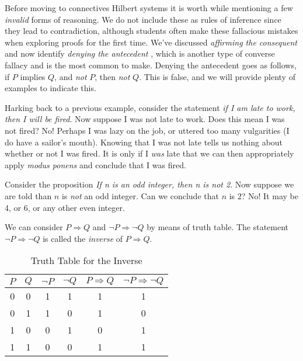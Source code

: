         Before moving to connectives Hilbert systems it is worth while
        mentioning a few \textit{invalid} forms of reasoning. We do not include
        these as rules of inference since they lead to contradiction, although
        students often make these fallacious mistakes when exploring proofs for
        the first time. We've discussed \textit{affirming the consequent} and
        now identify \textit{denying the antecedent}%
        , which is another type of
        converse fallacy and is the most common to make. Denying the antecedent
        goes as follows, if $P$ implies $Q$, and \textit{not} $P$, then
        \textit{not} $Q$. This is false, and we will provide plenty of examples
        to indicate this.
        \begin{example}
            Harking back to a previous example, consider the statement
            \textit{if I am late to work, then I will be fired}. Now suppose I
            was not late to work. Does this mean I was not fired? No! Perhaps I
            was lazy on the job, or uttered too many vulgarities (I do have a
            sailor's mouth). Knowing that I was not late tells us nothing about
            whether or not I was fired. It is only if I \textit{was} late that
            we can then appropriately apply \textit{modus ponens} and conclude
            that I was fired.
        \end{example}
        \begin{example}
            Consider the proposition
            \textit{If n is an odd integer, then n is not 2}. Now suppose we are
            told than $n$ is \textit{not} an odd integer. Can we conclude that
            $n$ is 2? No! It may be 4, or 6, or any other even integer.
        \end{example}
        We can consider $P\Rightarrow{Q}$ and $\neg{P}\Rightarrow\neg{Q}$ by
        means of truth table. The statement $\neg{P}\Rightarrow\neg{Q}$ is
        called the \textit{inverse} of $P\Rightarrow{Q}$.
        \begin{table}[H]
            \centering
            \captionsetup{type=table}
            \begin{tabular}{c|c|c|c|c|c}
                $P$&$Q$&$\neg{P}$&$\neg{Q}$&$P\Rightarrow{Q}$
                                           &$\neg{P}\Rightarrow\neg{Q}$\\
                \hline
                0&0&1&1&1&1\\
                0&1&1&0&1&0\\
                1&0&0&1&0&1\\
                1&1&0&0&1&1
            \end{tabular}
            \caption{Truth Table for the Inverse}
            \label{tab:Truth_Table_Inverse}
        \end{table}

